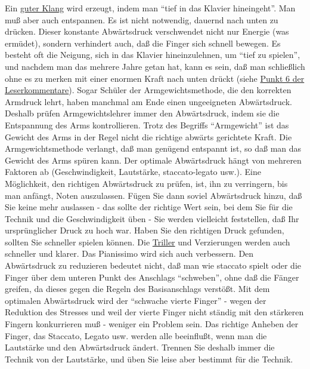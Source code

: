 Ein \hyperref[c1iii1a]{guter Klang} wird erzeugt, indem man \enquote{tief in das Klavier hineingeht}.
Man muß aber auch entspannen.
Es ist nicht notwendig, dauernd nach unten zu drücken.
Dieser konstante Abwärtsdruck verschwendet nicht nur Energie (was ermüdet), sondern verhindert auch, daß die Finger sich schnell bewegen.
Es besteht oft die Neigung, sich in das Klavier hineinzulehnen, um \enquote{tief zu spielen}, und nachdem man das mehrere Jahre getan hat, kann es sein, daß man schließlich ohne es zu merken mit einer enormen Kraft nach unten drückt (siehe \hyperref[testimonials06]{Punkt 6 der Leserkommentare}).
Sogar Schüler der Armgewichtsmethode, die den korrekten Armdruck lehrt, haben manchmal am Ende einen ungeeigneten Abwärtsdruck.
Deshalb prüfen Armgewichtslehrer immer den Abwärtsdruck, indem sie die Entspannung des Arms kontrollieren.
Trotz des Begriffs \enquote{Armgewicht} ist das Gewicht des Arms in der Regel nicht die richtige abwärts gerichtete Kraft.
Die Armgewichtsmethode verlangt, daß man genügend entspannt ist, so daß man das Gewicht des Arms spüren kann.
Der optimale Abwärtsdruck hängt von mehreren Faktoren ab (Geschwindigkeit, Lautstärke, staccato-legato usw.).
Eine Möglichkeit, den richtigen Abwärtsdruck zu prüfen, ist, ihn zu verringern, bis man anfängt, Noten auszulassen.
Fügen Sie dann soviel Abwärtsdruck hinzu, daß Sie keine mehr auslassen - das sollte der richtige Wert sein, bei dem Sie für die Technik und die Geschwindigkeit üben - Sie werden vielleicht feststellen, daß Ihr ursprünglicher Druck zu hoch war.
Haben Sie den richtigen Druck gefunden, sollten Sie schneller spielen können.
Die \hyperref[c1iii3]{Triller} und Verzierungen werden auch schneller und klarer.
Das Pianissimo wird sich auch verbessern.
Den Abwärtsdruck zu reduzieren bedeutet nicht, daß man wie staccato spielt oder die Finger über dem unteren Punkt des Anschlags \enquote{schweben}, ohne daß die Fänger greifen, da dieses gegen die Regeln des Basisanschlags verstößt.
Mit dem optimalen Abwärtsdruck wird der \enquote{schwache vierte Finger} - wegen der Reduktion des Stresses und weil der vierte Finger nicht ständig mit den stärkeren Fingern konkurrieren muß - weniger ein Problem sein.
Das richtige Anheben der Finger, das Staccato, Legato usw. werden alle beeinflußt, wenn man die Lautstärke und den Abwärtsdruck ändert.
Trennen Sie deshalb immer die Technik von der Lautstärke, und üben Sie leise aber bestimmt für die Technik.

